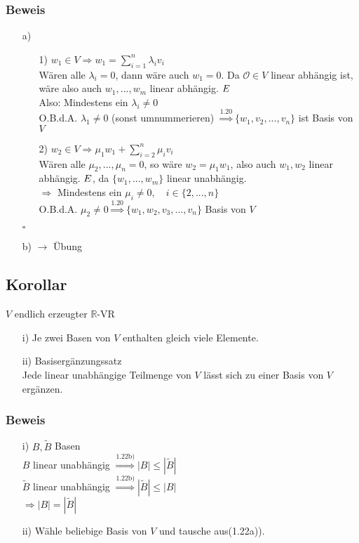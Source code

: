 \documentclass[12pt,titlepage, pdf]{article}
\newcommand{\R}{\mathds{R}}
\renewcommand{\>}{\rightarrow}
\renewcommand{\*}{\cdot}
\begin{document}
\subsubsection*{Beweis}
\begin{itemize}
	\item[a)] \begin{itemize}
		\item[1)] $w_1\in V\Rightarrow w_1=\sum_{i=1}^{n}\lambda_iv_i$\\
		Wären alle $\lambda_i=0$, dann wäre auch $w_1=0$. Da $\mathcal{O}\in V$ linear abhängig ist, wäre also auch $w_1,...,w_m$ linear abhängig. $\Lightning$\\
		Also: Mindestens ein $\lambda_i\neq 0$\\
		O.B.d.A. $\lambda_1\neq 0$ (sonst umnummerieren) $\overset{\textrm{1.20}}{\Rightarrow}\{w_1,v_2,...,v_n\}$ ist Basis von $V$
		\item[2)]  $w_2\in V\Rightarrow \mu_1w_1+\sum_{i=2}^{n}\mu_iv_i$\\
		Wären alle $\mu_2,...,\mu_n=0$, so wäre $w_2=\mu_1w_1$, also auch $w_1,w_2$ linear abhängig. $\Lightning$, da $\{w_1,...,w_m\}$ linear unabhängig.\\
		$\Rightarrow$ Mindestens ein $\mu_i\neq 0,\quad i\in\{2,...,n\}$\\
		O.B.d.A. $\mu_2\neq 0\overset{\textrm{1.20}}{\Rightarrow}\{w_1,w_2,v_3,...,v_n\}$ Basis von $V$
	\end{itemize}\hfill$\square$
	\item[b)] $\rightarrow$ Übung
\end{itemize}
\subsection{Korollar}
$V$ endlich erzeugter $\R$-VR
\begin{itemize}
	\item[i)] Je zwei Basen von $V$ enthalten gleich viele Elemente.
	\item[ii)] Basisergänzungssatz\\
	Jede linear unabhängige Teilmenge von $V$ lässt sich zu einer Basis von $V$ ergänzen.
\end{itemize}
\subsubsection*{Beweis}
\begin{itemize}
	\item[i)] $B,\tilde{B}$ Basen\\
	$B$ linear unabhängig $\overset{\textrm{1.22b)}}{\Rightarrow}|B|\leq|\tilde{B}|$\\
	$\tilde{B}$ linear unabhängig $\overset{\textrm{1.22b)}}{\Rightarrow}|\tilde{B}|\leq|B|$\\
	$\Rightarrow|B|=|\tilde{B}|$
	\item[ii)] Wähle beliebige Basis von $V$ und tausche aus(1.22a)).
\end{itemize}
\end{document}
